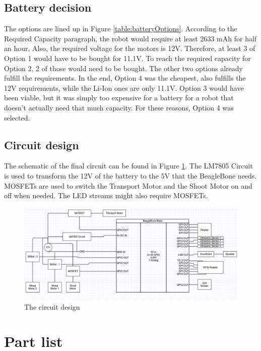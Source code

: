 \documentclass[11pt,twoside,a4paper]{report}
\begin{document}
\subsection{Battery decision}
The options are lined up in Figure \ref{table:batteryOptions}. According to the Required Capacity paragraph, the robot would require at least 2633 mAh for half an hour. Also, the required voltage for the motors is 12V. Therefore, at least 3 of Option 1 would have to be bought for 11.1V. To reach the required capacity for Option 2, 2 of those would need to be bought. The other two options already fulfill the requirements. 
In the end, Option 4 was the cheapest, also fulfills the 12V requirements, while the Li-Ion ones are only 11.1V. Option 3 would have been viable, but it was simply too expensive for a battery for a robot that doesn’t actually need that much capacity. 
For these reasons, Option 4 was selected. 
 \newpage
\subsection{Circuit design}
The schematic of the final circuit can be found in Figure \ref{fig:electronics}. The LM7805 Circuit is used to transform the 12V of the battery to the 5V that the BeagleBone needs. MOSFETs are used to switch the Transport Motor and the Shoot Motor on and off when needed. The LED streams might also require MOSFETs. 
\begin{figure}[H]
\begin{center}
\includegraphics[width = 17cm]{Images/ElectronicalDiagram.png}
\caption{The circuit design}
\label{fig:electronics}
\end{center}
\end{figure}

\section{Part list}
\end{document}
